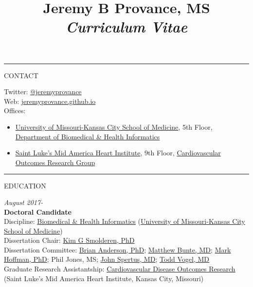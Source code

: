 \documentclass[
]{article}
\title{Jeremy B \textbf{Provance}, MS \emph{Curriculum Vitae}}
\author{}
\date{\vspace{-2.5em}}
\begin{document}
\maketitle

\begin{center}\rule{0.5\linewidth}{0.5pt}\end{center}

CONTACT

Twitter: \href{https://twitter.com/jeremyprovance}{@jeremyprovance}\\
Web: \href{https://jeremyprovance.github.io}{jeremyprovance.github.io}\\
Offices:

\begin{itemize}
\item
  \href{http://med.umkc.edu}{University of Missouri-Kansas City School
  of Medicine}, 5th Floor, \href{http://med.umkc.edu/dbhi/}{Department
  of Biomedical \& Health Informatics}
\item
  \href{https://www.saintlukeskc.org/locations/saint-lukes-mid-america-heart-institute}{Saint
  Luke's Mid America Heart Institute}, 9th Floor,
  \href{https://cvoutcomes.org}{Cardiovascular Outcomes Research Group}
\end{itemize}

\begin{center}\rule{0.5\linewidth}{0.5pt}\end{center}

EDUCATION

\emph{August 2017-}\\
\textbf{Doctoral Candidate}\\
Discipline: \href{http://med.umkc.edu/dbhi/}{Biomedical \& Health
Informatics} (\href{http://med.umkc.edu}{University of Missouri-Kansas
City School of Medicine})\\
Dissertation Chair:
\href{https://medicine.yale.edu/research-profile/kim_smolderen/}{Kim G
Smolderen, PhD}\\
Dissertation Committee:
\href{https://bloch.umkc.edu/faculty-directory-anderson-brian/}{Brian
Anderson, PhD};
\href{https://doctors.saintlukeskc.org/provider/Matthew+C+Bunte/1458570}{Matthew
Bunte, MD};
\href{https://researchers.childrensmercy.org/display/30252}{Mark
Hoffman, PhD}; Phil Jones, MS;
\href{http://med.umkc.edu/dir/Spertus-John/}{John Spertus, MD};
\href{https://www.muhealth.org/doctors/todd-vogel-md}{Todd Vogel, MD}\\
Graduate Research Assistantship:
\href{https://cvoutcomes.org}{Cardiovascular Disease Outcomes Research}
(Saint Luke's Mid America Heart Institute, Kansas City, Missouri)
\end{document}

